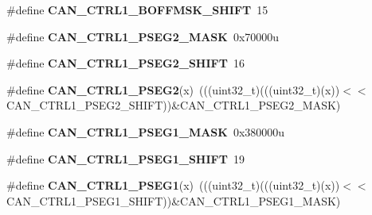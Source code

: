 \begin{DoxyCompactItemize}
\item 
\#define {\bfseries C\+A\+N\+\_\+\+C\+T\+R\+L1\+\_\+\+B\+O\+F\+F\+M\+S\+K\+\_\+\+S\+H\+I\+FT}~15\hypertarget{group__CAN__Register__Masks_ga9f3df553dda57c9cb36c599ee20bc598}{}\label{group__CAN__Register__Masks_ga9f3df553dda57c9cb36c599ee20bc598}

\item 
\#define {\bfseries C\+A\+N\+\_\+\+C\+T\+R\+L1\+\_\+\+P\+S\+E\+G2\+\_\+\+M\+A\+SK}~0x70000u\hypertarget{group__CAN__Register__Masks_ga204a1f6435e791f02d599543020b4b15}{}\label{group__CAN__Register__Masks_ga204a1f6435e791f02d599543020b4b15}

\item 
\#define {\bfseries C\+A\+N\+\_\+\+C\+T\+R\+L1\+\_\+\+P\+S\+E\+G2\+\_\+\+S\+H\+I\+FT}~16\hypertarget{group__CAN__Register__Masks_ga667a8faa98245aa9fa5afc6e71b7f640}{}\label{group__CAN__Register__Masks_ga667a8faa98245aa9fa5afc6e71b7f640}

\item 
\#define {\bfseries C\+A\+N\+\_\+\+C\+T\+R\+L1\+\_\+\+P\+S\+E\+G2}(x)~(((uint32\+\_\+t)(((uint32\+\_\+t)(x))$<$$<$C\+A\+N\+\_\+\+C\+T\+R\+L1\+\_\+\+P\+S\+E\+G2\+\_\+\+S\+H\+I\+FT))\&C\+A\+N\+\_\+\+C\+T\+R\+L1\+\_\+\+P\+S\+E\+G2\+\_\+\+M\+A\+SK)\hypertarget{group__CAN__Register__Masks_ga946e3c21fc4af7782950571c86ae9f91}{}\label{group__CAN__Register__Masks_ga946e3c21fc4af7782950571c86ae9f91}

\item 
\#define {\bfseries C\+A\+N\+\_\+\+C\+T\+R\+L1\+\_\+\+P\+S\+E\+G1\+\_\+\+M\+A\+SK}~0x380000u\hypertarget{group__CAN__Register__Masks_gac32963f42638264064b58687c249c994}{}\label{group__CAN__Register__Masks_gac32963f42638264064b58687c249c994}

\item 
\#define {\bfseries C\+A\+N\+\_\+\+C\+T\+R\+L1\+\_\+\+P\+S\+E\+G1\+\_\+\+S\+H\+I\+FT}~19\hypertarget{group__CAN__Register__Masks_gab92532aaca53b7fae9c2d9d7186e3a91}{}\label{group__CAN__Register__Masks_gab92532aaca53b7fae9c2d9d7186e3a91}

\item 
\#define {\bfseries C\+A\+N\+\_\+\+C\+T\+R\+L1\+\_\+\+P\+S\+E\+G1}(x)~(((uint32\+\_\+t)(((uint32\+\_\+t)(x))$<$$<$C\+A\+N\+\_\+\+C\+T\+R\+L1\+\_\+\+P\+S\+E\+G1\+\_\+\+S\+H\+I\+FT))\&C\+A\+N\+\_\+\+C\+T\+R\+L1\+\_\+\+P\+S\+E\+G1\+\_\+\+M\+A\+SK)\hypertarget{group__CAN__Register__Masks_ga513ec9c9968b0f6971bdd54c2524d919}{}\label{group__CAN__Register__Masks_ga513ec9c9968b0f6971bdd54c2524d919}


\end{DoxyCompactItemize}
